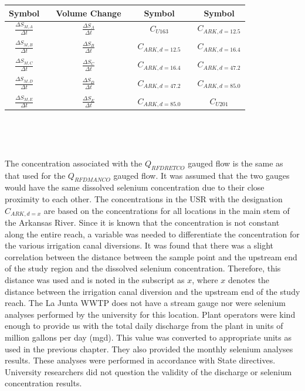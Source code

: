 \begin{table}[htbp]
\begin{subtable}{\textwidth}
\begin{tabular}{c c c c c c c}
			Symbol & & Volume Change & & Symbol & & Symbol\\
			\toprule 
			$ \displaystyle \frac{\Delta S_{M,A}}{\Delta t} $ & & $ \displaystyle \frac{\Delta S_A}{\Delta t} $ & & $ C_{U163} $ & & $ C_{ARK,d=12.5} $\\ \\
			$ \displaystyle \frac{\Delta S_{M,B}}{\Delta t} $ & & $ \displaystyle \frac{\Delta S_B}{\Delta t} $ & & $ C_{ARK,d=12.5} $ & & $ C_{ARK,d=16.4} $\\ \\
			$ \displaystyle \frac{\Delta S_{M,C}}{\Delta t} $ & & $ \displaystyle \frac{\Delta S_C}{\Delta t} $ & & $ C_{ARK,d=16.4} $ & & $ C_{ARK,d=47.2} $\\ \\
			$ \displaystyle \frac{\Delta S_{M,D}}{\Delta t} $ & & $ \displaystyle \frac{\Delta S_D}{\Delta t} $ & & $ C_{ARK,d=47.2} $ & & $ C_{ARK,d=85.0} $\\ \\
			$ \displaystyle \frac{\Delta S_{M,E}}{\Delta t} $ & & $ \displaystyle \frac{\Delta S_E}{\Delta t} $ & & $ C_{ARK,d=85.0} $ & & $ C_{U201} $\\
			\bottomrule
		\end{tabular} \\
	\end{subtable}\\
\end{table}

The concentration associated with the $ Q_{RFDRETCO} $ gauged flow is the same as that used for the $ Q_{RFDMANCO} $ gauged flow.  It was assumed that the two gauges would have the same dissolved selenium concentration due to their close proximity to each other.  The concentrations in the USR with the designation $ C_{ARK,d=x} $ are based on the concentrations for all locations in the main stem of the Arkansas River.  Since it is known that the concentration is not constant along the entire reach, a variable was needed to differentiate the concentration for the various irrigation canal diversions.  It was found that there was a slight correlation between the distance between the sample point and the upstream end of the study region and the dissolved selenium concentration.  Therefore, this distance was used and is noted in the subscript as $ x $, where $ x $ denotes the distance between the irrigation canal diversion and the upstream end of the study reach.  The La Junta WWTP does not have a stream gauge nor were selenium analyses performed by the university for this location.  Plant operators were kind enough to provide us with the total daily discharge from the plant in units of million gallons per day (mgd).  This value was converted to appropriate units as used in the previous chapter.  They also provided the monthly selenium analyses results.  These analyses were performed in accordance with State directives.  University researchers did not question the validity of the discharge or selenium concentration results.

